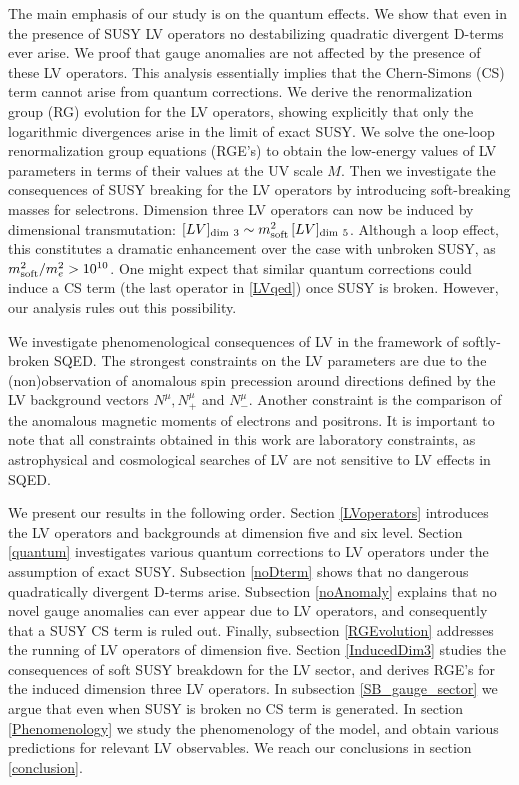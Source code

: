 \documentclass[12pt]{revtex4}
\begin{document}
The main emphasis of our study is on the quantum effects. We show that
even in the presence of SUSY LV operators no destabilizing quadratic
divergent D-terms ever arise. We proof that gauge anomalies are
not affected by the presence of these LV operators. This analysis
essentially implies that the Chern-Simons (CS) term cannot arise from quantum
corrections. We derive the renormalization group (RG) evolution for the
LV operators, showing explicitly that only the logarithmic divergences
arise in the limit of exact SUSY. We solve the one-loop
renormalization group equations (RGE's)  to obtain the low-energy
values of LV parameters in terms of their values at the UV scale
$M$. 
Then we investigate the consequences of SUSY breaking for the
LV operators by introducing soft-breaking masses for selectrons.
Dimension three LV operators can now be induced by dimensional
transmutation: 
$[LV]_{\rm dim~3} \sim m_{\rm soft}^2 \, [LV]_{\rm dim~5}$. 
Although a loop effect, this constitutes a dramatic enhancement over
the case with unbroken SUSY, as $ m_{\rm soft}^2/m_e^2 > 10^{10}$.  
One might expect that similar quantum corrections could induce a CS
term (the last operator in \eqref{LVqed}) once SUSY is
broken. However, our analysis rules out this possibility. 


We investigate phenomenological consequences of LV in the framework of
softly-broken SQED. The strongest constraints on the LV parameters are
due to the (non)observation of anomalous spin precession
around directions defined by the LV background vectors $N^\mu,
N_+^\mu$ and $N_-^\mu$. Another constraint is the
comparison of the anomalous magnetic moments of electrons and  
positrons. It is important to note that all constraints obtained in this 
work are laboratory constraints, as astrophysical and cosmological 
searches of LV are not sensitive to LV effects in SQED. 


We present our results in the following order. Section \ref{LVoperators} 
introduces the LV operators and backgrounds at dimension five and six
level. Section \ref{quantum} investigates various quantum corrections
to LV operators under the assumption of exact SUSY. Subsection
\ref{noDterm} shows that no dangerous quadratically divergent D-terms
arise. Subsection \ref{noAnomaly} explains that no novel gauge
anomalies can ever appear due to LV operators, and consequently that
a SUSY CS term is ruled out. Finally, subsection \ref{RGEvolution}
addresses the running of LV operators of dimension five. Section
\ref{InducedDim3} studies the consequences of soft SUSY breakdown for
the LV sector, and derives RGE's for the induced dimension three LV
operators. In subsection \ref{SB_gauge_sector} we argue that even when
SUSY is broken no CS term is generated. In section \ref{Phenomenology}
we study the phenomenology of the model, and obtain various
predictions for relevant LV observables.  We reach our conclusions in
section 
\ref{conclusion}.   
\end{document}
